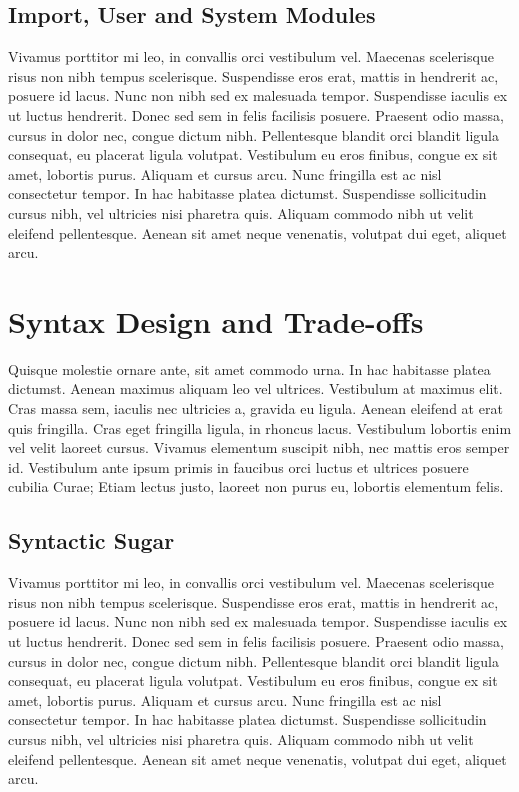 \subsection{Import, User and System Modules}
Vivamus porttitor mi leo, in convallis orci vestibulum vel. Maecenas scelerisque risus non nibh tempus scelerisque. Suspendisse eros erat, mattis in hendrerit ac, posuere id lacus. Nunc non nibh sed ex malesuada tempor. Suspendisse iaculis ex ut luctus hendrerit. Donec sed sem in felis facilisis posuere. Praesent odio massa, cursus in dolor nec, congue dictum nibh. Pellentesque blandit orci blandit ligula consequat, eu placerat ligula volutpat. Vestibulum eu eros finibus, congue ex sit amet, lobortis purus. Aliquam et cursus arcu. Nunc fringilla est ac nisl consectetur tempor. In hac habitasse platea dictumst. Suspendisse sollicitudin cursus nibh, vel ultricies nisi pharetra quis. Aliquam commodo nibh ut velit eleifend pellentesque. Aenean sit amet neque venenatis, volutpat dui eget, aliquet arcu.


\section{Syntax Design and Trade-offs}
Quisque molestie ornare ante, sit amet commodo urna. In hac habitasse platea dictumst. Aenean maximus aliquam leo vel ultrices. Vestibulum at maximus elit. Cras massa sem, iaculis nec ultricies a, gravida eu ligula. Aenean eleifend at erat quis fringilla. Cras eget fringilla ligula, in rhoncus lacus. Vestibulum lobortis enim vel velit laoreet cursus. Vivamus elementum suscipit nibh, nec mattis eros semper id. Vestibulum ante ipsum primis in faucibus orci luctus et ultrices posuere cubilia Curae; Etiam lectus justo, laoreet non purus eu, lobortis elementum felis.

\subsection{Syntactic Sugar}
Vivamus porttitor mi leo, in convallis orci vestibulum vel. Maecenas scelerisque risus non nibh tempus scelerisque. Suspendisse eros erat, mattis in hendrerit ac, posuere id lacus. Nunc non nibh sed ex malesuada tempor. Suspendisse iaculis ex ut luctus hendrerit. Donec sed sem in felis facilisis posuere. Praesent odio massa, cursus in dolor nec, congue dictum nibh. Pellentesque blandit orci blandit ligula consequat, eu placerat ligula volutpat. Vestibulum eu eros finibus, congue ex sit amet, lobortis purus. Aliquam et cursus arcu. Nunc fringilla est ac nisl consectetur tempor. In hac habitasse platea dictumst. Suspendisse sollicitudin cursus nibh, vel ultricies nisi pharetra quis. Aliquam commodo nibh ut velit eleifend pellentesque. Aenean sit amet neque venenatis, volutpat dui eget, aliquet arcu.

